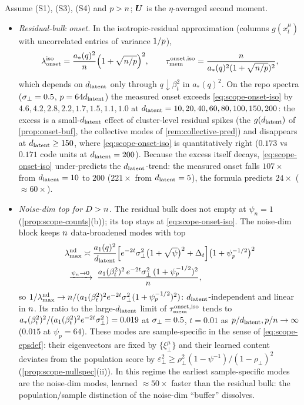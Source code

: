 \begin{proposition}\label{prop:scope-rebound}
Assume (S1), (S3), (S4) and $p>n$; $\bm{U}$ is the $\eta$-averaged second moment.
\begin{itemize}
\item[(a)] \emph{Residual-bulk onset.} In the isotropic-residual approximation (columns $g(x^\mu_t)$ with uncorrelated entries of variance $1/p$),
\begin{equation}\label{eq:scope-onset-iso}
\lambda_{\rm onset}^{\rm iso}=\frac{a_*(q)^2}{n}\Big(1+\sqrt{n/p}\Big)^2,\qquad \tau_{\mathrm{mem}}^{\rm onset,iso}=\frac{n}{a_*(q)^2(1+\sqrt{n/p})^2},
\end{equation}
which depends on $d_{\mathrm{latent}}$ only through $q\downarrow\beta_t^2$ in $a_*(q)^2$. On the repo spectra ($\sigma_{\perp}=0.5$, $p=64d_{\mathrm{latent}}$) the measured onset exceeds \eqref{eq:scope-onset-iso} by $4.6,4.2,2.8,2.2,1.7,1.5,1.1,1.0$ at $d_{\mathrm{latent}}=10,20,40,60,80,100,150,200$: the excess is a small-$d_{\mathrm{latent}}$ effect of cluster-level residual spikes (the $g(d_{\mathrm{latent}})$ of \cref{prop:onset-buf}, the collective modes of \cref{rem:collective-pred}) and disappears at $d_{\mathrm{latent}}\ge150$, where \eqref{eq:scope-onset-iso} is quantitatively right ($0.173$ vs $0.171$ code units at $d_{\mathrm{latent}}=200$). Because the excess itself decays, \eqref{eq:scope-onset-iso} under-predicts the $d_{\mathrm{latent}}$-trend: the measured onset falls $107\times$ from $d_{\mathrm{latent}}=10$ to $200$ ($221\times$ from $d_{\mathrm{latent}}=5$), the formula predicts $24\times$ ($\approx60\times$).
\item[(b)] \emph{Noise-dim top for $D>n$.} The residual bulk does not empty at $\psi_n=1$ (\cref{prop:scope-counts}(b)); its top stays at \eqref{eq:scope-onset-iso}. The noise-dim block keeps $n$ data-broadened modes with top
\begin{equation}\label{eq:scope-onset-rd}
\begin{aligned}
&\lambda^{\rm nd}_{\max}\asymp\frac{a_1(q)^2}{d_{\mathrm{latent}}}\Big[e^{-2t}\sigma_{\perp}^2\big(1+\sqrt{\psi}\big)^2+\Delta_t\Big]\big(1+\psi_p^{-1/2}\big)^2\\ &\;\xrightarrow{\psi_n\to0}\;\frac{a_1(\beta_t^2)^2\,e^{-2t}\sigma_{\perp}^2\,(1+\psi_p^{-1/2})^2}{n},
\end{aligned}
\end{equation}
so $1/\lambda^{\rm nd}_{\max}\to n/(a_1(\beta_t^2)^2e^{-2t}\sigma_{\perp}^2(1+\psi_p^{-1/2})^2)$: $d_{\mathrm{latent}}$-independent and linear in $n$. Its ratio to the large-$d_{\mathrm{latent}}$ limit of $\tau_{\mathrm{mem}}^{\rm onset,iso}$ tends to $a_*(\beta_t^2)^2/(a_1(\beta_t^2)^2e^{-2t}\sigma_{\perp}^2)=0.019$ at $\sigma_{\perp}=0.5$, $t=0.01$ as $p/d_{\mathrm{latent}},p/n\to\infty$ ($0.015$ at $\psi_p=64$). These modes are sample-specific in the sense of \eqref{eq:scope-epsdef}: their eigenvectors are fixed by $\{\xi^\mu_\perp\}$ and their learned content deviates from the population score by $\varepsilon_\perp^2\ge\rho_\perp^2(1-\psi^{-1})/(1-\rho_\perp)^2$ (\cref{prop:scope-nullspec}(ii)). In this regime the earliest sample-specific modes are the noise-dim modes, learned $\approx50\times$ faster than the residual bulk: the population/sample distinction of the noise-dim ``buffer'' dissolves.
\end{itemize}
\end{proposition}
